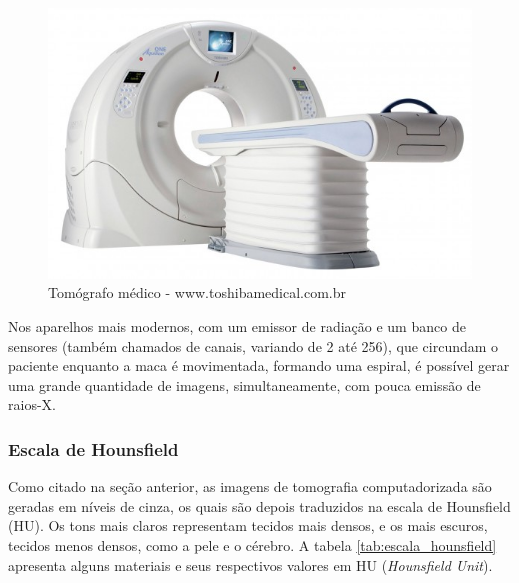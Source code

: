 \begin{figure}[!htb]
\centering
\includegraphics[scale=0.4]{../user_guide_figures/tomografo.jpg}
\caption{Tomógrafo médico - www.toshibamedical.com.br}
\end{figure}


Nos aparelhos mais modernos, com um emissor de radiação e um banco de
sensores (também chamados de canais, variando de 2 até 256), que circundam o paciente
enquanto a maca é movimentada, formando uma espiral, é possível gerar uma
grande quantidade de imagens, simultaneamente, com pouca emissão de raios-X.


\subsubsection{Escala de Hounsfield}
Como citado na seção anterior, as imagens de tomografia computadorizada
são geradas em níveis de cinza, os quais são depois traduzidos na escala
de Hounsfield (HU). Os tons mais claros representam tecidos mais densos, e
os mais escuros, tecidos menos densos, como a pele e o cérebro.
A tabela \ref{tab:escala_hounsfield} apresenta alguns materiais e seus 
respectivos valores em HU (\textit{Hounsfield Unit}).


